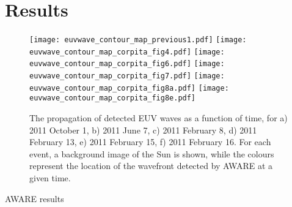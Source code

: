 \section{Results}\label{sec:results}


\begin{figure}
\begin{center}
\texttt{[image: euvwave\_contour\_map\_previous1.pdf]}
\texttt{[image: euvwave\_contour\_map\_corpita\_fig4.pdf]}
\texttt{[image: euvwave\_contour\_map\_corpita\_fig6.pdf]}
\texttt{[image: euvwave\_contour\_map\_corpita\_fig7.pdf]}
\texttt{[image: euvwave\_contour\_map\_corpita\_fig8a.pdf]}
\texttt{[image: euvwave\_contour\_map\_corpita\_fig8e.pdf]}
\caption{The propagation of detected EUV waves as a function of time, for a) 2011 October 1, b) 2011 June 7, c) 2011 February 8, d) 2011 February 13, e) 2011 February 15, f) 2011 February 16. For each event, a background image of the Sun is shown, while the colours represent the location of the wavefront detected by AWARE at a given time.}
\end{center}
\end{figure}

AWARE results
